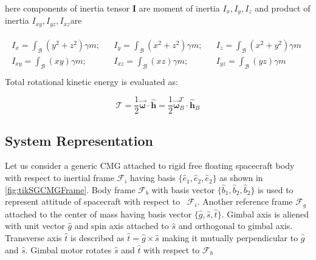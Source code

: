here components of inertia tensor $\displaystyle \mathbf{I}$ are moment of inertia $\displaystyle I_{x} ,I_{y} ,I_{z}$ and product of inertia $\displaystyle I_{xy} ,I_{yz} ,I_{xz}$are


\begin{gather*}
 \begin{aligned}
I_{x} =\int _{\mathcal{B}}\left( y^{2} +z^{2}\right) \gamma m; & & I_{y} =\int _{\mathcal{B}}\left( x^{2} +z^{2}\right) \gamma m; & & I_{z} =\int _{\mathcal{B}}\left( x^{2} +y^{2}\right) \gamma m\\
I_{xy} =\int _{\mathcal{B}}( xy) \gamma m; & & I_{xz} =\int _{\mathcal{B}}( xz) \gamma m; & & I_{yz} =\int _{\mathcal{B}}( yz) \gamma m
\end{aligned} \ \ \\
\end{gather*}
Total rotational kinetic energy is evaluated as:



\begin{equation}
\mathcal{T} =\frac{1}{2}\vec{\mathbf{\omega }} \cdotp \hat{\mathbf{h}} =\frac{1}{2}\vec{\mathbf{\omega }}^{T}_{B} \cdotp \hat{\mathbf{h}}_{B}
\end{equation}


\subsection{System Representation}
Let us consider a generic CMG attached to rigid free floating spacecraft body with respect to inertial frame $\displaystyle \mathcal{F}_{i}$ having basis $\displaystyle \{\hat{e}_{1} ,\hat{e}_{2} ,\hat{e}_{2}\}$ as shown in \autoref{fig:tikSGCMGFrame}. Body frame $\displaystyle \mathcal{F}_{b}$ with basis vector $\displaystyle \{\hat{b}_{1} ,\hat{b}_{2} ,\hat{b}_{2}\}$ is used to represent attitude of spacecraft with respect to \ $\displaystyle \mathcal{F}_{i}$. Another reference frame $\displaystyle \mathcal{F}_{g}$ attached to the center of mass having basis vector $\displaystyle \{\hat{g} ,\hat{s} ,\hat{t}\}$. Gimbal axis is aliened with unit vector $\displaystyle \hat{g}$ and spin axis attached to $\displaystyle \hat{s}$ and orthogonal to gimbal axis. Transverse axis $\displaystyle \hat{t}$ is described as $\displaystyle \hat{t} =\hat{g} \times \hat{s}$ making it mutually perpendicular to $\displaystyle \hat{g}$ and $\displaystyle \hat{s}$. Gimbal motor rotates $\displaystyle \hat{s}$ and $\displaystyle \hat{t}$ with respect to $\displaystyle \mathcal{F}_{b}$

